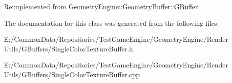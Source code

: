Reimplemented from \mbox{\hyperlink{class_geometry_engine_1_1_geometry_buffer_1_1_g_buffer_a9f20eb78703ef048d59a54f90ee09f25}{Geometry\+Engine\+::\+Geometry\+Buffer\+::\+G\+Buffer}}.



The documentation for this class was generated from the following files\+:\begin{DoxyCompactItemize}
\item 
E\+:/\+Common\+Data/\+Repositories/\+Test\+Game\+Engine/\+Geometry\+Engine/\+Render Utils/\+G\+Buffers/Single\+Color\+Texture\+Buffer.\+h\item 
E\+:/\+Common\+Data/\+Repositories/\+Test\+Game\+Engine/\+Geometry\+Engine/\+Render Utils/\+G\+Buffers/Single\+Color\+Texture\+Buffer.\+cpp\end{DoxyCompactItemize}
